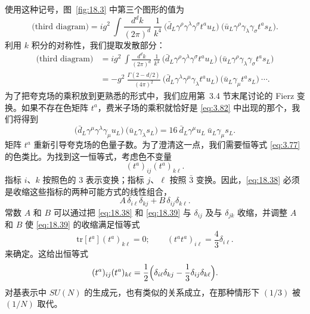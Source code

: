 使用这种记号，图~\ref{fig:18.3} 中第三个图形的值为
\begin{equation}
  \text{(third diagram)} = ig^2\ \int \frac{d^dk}{(2\pi)^d}\ \frac{1}{k^4}\
    \bigl( \bar{d}_L\gamma^\rho\gamma^\lambda\gamma^\sigma t^a u_L \bigr)\
    \bigl( \bar{u}_L\gamma^\rho\gamma_\lambda\gamma_\sigma t^a s_L \bigr) .
  \label{eq:18.35}
\end{equation}
利用 $k$ 积分的对称性，我们提取发散部分：
\begin{equation}
  \begin{aligned}
    \text{(third diagram)} &= ig^2\ \int \frac{d^dk}{(2\pi)^d}\ \frac{1}{k^4}\
      \bigl( \bar{d}_L\gamma^\rho\gamma^\lambda\gamma^\sigma t^a u_L \bigr)\
      \bigl( \bar{u}_L\gamma^\rho\gamma_\lambda\gamma_\sigma t^a s_L \bigr)\\
    &= -g^2\ \frac{\Gamma(2-d/2)}{(4\pi)^2}\ \bigl( \bar{d}_L\gamma^\lambda
      \gamma^\mu\gamma_\lambda t^a u_L \bigr)\ \bigl( \bar{u}_L\gamma_\mu
        t^a s_L \bigr)\ \cdots .
  \end{aligned}
  \label{eq:18.36}
\end{equation}
为了把夸克场的乘积放到更熟悉的形式中，我们应用第~3.4 节末尾讨论的 Fierz 变换。如果不存在色矩阵 $t^a$，费米子场的乘积就恰好是 \eqref{eq:3.82} 中出现的那个，我们将得到
\begin{equation}
  \bigl( \bar{d}_L\gamma^\mu\gamma^\lambda\gamma_\mu u_L \bigr)\
    \bigl( \bar{u}_L\gamma_\lambda s_L \bigr) = 16\ \bar{d}_L\gamma^\mu u_L\
    \bar{u}_L\gamma_\mu s_L .
  \label{eq:18.37}
\end{equation}
矩阵 $t^a$ 重新引导夸克场的色量子数。为了澄清这一点，我们需要恒等式 \eqref{eq:3.77} 的色类比。为找到这一恒等式，考虑色不变量
\begin{equation}
  (t^a)_{ij}(t^a)_{k\ell} .
  \label{eq:18.38}
\end{equation}
指标 $i$、$k$ 按照色的 3 表示变换；指标 $j$、$\ell$ 按照 $\bar{3}$ 变换。因此，\eqref{eq:18.38} 必须是收缩这些指标的两种可能方式的线性组合，
\begin{equation}
  A\,\delta_{i\ell}\delta_{kj} + B\,\delta_{ij}\delta_{k\ell} .
  \label{eq:18.39}
\end{equation}
常数 $A$ 和 $B$ 可以通过把 \eqref{eq:18.38} 和 \eqref{eq:18.39} 与 $\delta_{ij}$ 及与 $\delta_{jk}$ 收缩，并调整 $A$ 和 $B$ 使 \eqref{eq:18.39} 的收缩满足恒等式
\begin{equation}
  \mathrm{tr}[t^a](t^a)_{k\ell} = 0;\qquad
  (t^at^a)_{i\ell} = \frac{4}{3}\delta_{i\ell} .
  \label{eq:18.40}
\end{equation}
来确定。这给出恒等式
\begin{equation}
  (t^a)_{ij}(t^a)_{k\ell} = \frac{1}{2}\Bigl( \delta_{i\ell}\delta_{kj}
    - \frac{1}{3}\delta_{ij}\delta_{k\ell} \Bigr) .
  \label{eq:18.41}
\end{equation}
对基表示中 $SU(N)$ 的生成元，也有类似的关系成立，在那种情形下 $(1/3)$ 被 $(1/N)$ 取代。

